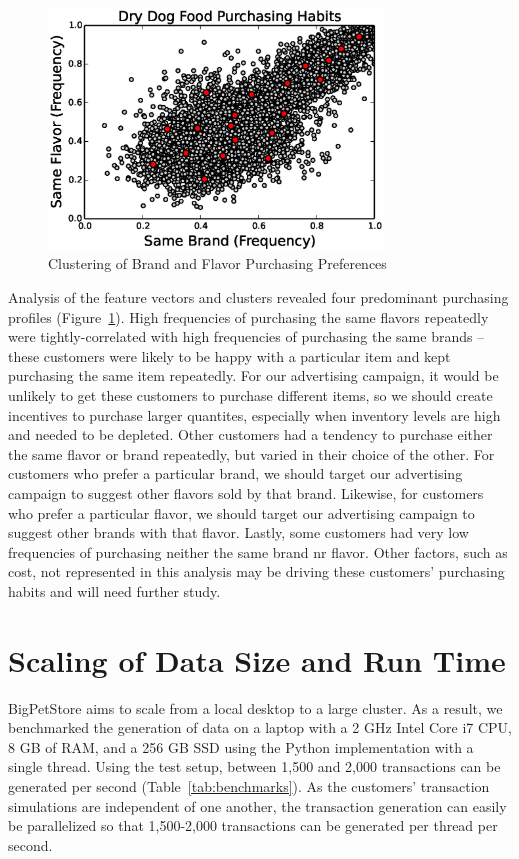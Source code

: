 \documentclass[conference]{IEEEtran}
\begin{document}
\begin{figure}[!t]
  \centering
  \includegraphics[width=3.5in]{figures/cluster_analysis.eps}
  \caption{Clustering of Brand and Flavor Purchasing Preferences}
  \label{fig:cluster_analysis}
\end{figure}

Analysis of the feature vectors and clusters revealed four predominant purchasing profiles (Figure~\ref{fig:cluster_analysis}).  High frequencies of purchasing the same flavors repeatedly were tightly-correlated with high frequencies of purchasing the same brands -- these customers were likely to be happy with a particular item and kept purchasing the same item repeatedly.  For our advertising campaign, it would be unlikely to get these customers to purchase different items, so we should create incentives to purchase larger quantites, especially when inventory levels are high and needed to be depleted.  Other customers had a tendency to purchase either the same flavor or brand repeatedly, but varied in their choice of the other.  For customers who prefer a particular brand, we should target our advertising campaign to suggest other flavors sold by that brand.  Likewise, for customers who prefer a particular flavor, we should target our advertising campaign to suggest other brands with that flavor.  Lastly, some customers had very low frequencies of purchasing neither the same brand nr flavor.  Other factors, such as cost, not represented in this analysis may be driving these customers' purchasing habits and will need further study.


\section{Scaling of Data Size and Run Time}
BigPetStore aims to scale from a local desktop to a large cluster. As a result, we benchmarked the generation of data on a laptop with a 2 GHz Intel Core i7 CPU, 8 GB of RAM, and a 256 GB SSD using the Python implementation with a single thread. Using the test setup, between 1,500 and 2,000 transactions can be generated per second (Table~\ref{tab:benchmarks}). As the customers' transaction simulations are independent of one another, the transaction generation can easily be parallelized so that 1,500-2,000 transactions can be generated per thread per second.
\end{document}
